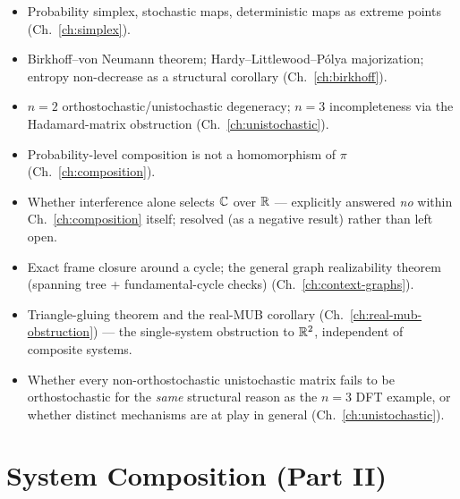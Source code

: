 \begin{itemize}
\item[{[D]}] Probability simplex, stochastic maps, deterministic maps as
extreme points (Ch.~\ref{ch:simplex}).
\item[{[D]}] Birkhoff--von Neumann theorem; Hardy--Littlewood--P\'olya
majorization; entropy non-decrease as a structural corollary
(Ch.~\ref{ch:birkhoff}).
\item[{[D]}] $n=2$ orthostochastic/unistochastic degeneracy; $n=3$
incompleteness via the Hadamard-matrix obstruction (Ch.~\ref{ch:unistochastic}).
\item[{[D]}] Probability-level composition is not a homomorphism of $\pi$
(Ch.~\ref{ch:composition}).
\item[{[U]}] Whether interference alone selects $\mathbb{C}$ over $\mathbb{R}$ — explicitly
answered \emph{no} within Ch.~\ref{ch:composition} itself; resolved (as a
negative result) rather than left open.
\item[{[D]}] Exact frame closure around a cycle; the general graph
realizability theorem (spanning tree + fundamental-cycle checks)
(Ch.~\ref{ch:context-graphs}).
\item[{[D]}] Triangle-gluing theorem and the real-MUB corollary
(Ch.~\ref{ch:real-mub-obstruction}) — the single-system obstruction to $\mathbb{R}^2$,
independent of composite systems.
\item[{[U]}] Whether every non-orthostochastic unistochastic matrix fails to
be orthostochastic for the \emph{same} structural reason as the $n=3$ DFT
example, or whether distinct mechanisms are at play in general
(Ch.~\ref{ch:unistochastic}).
\end{itemize}

\section{System Composition (Part II)}


